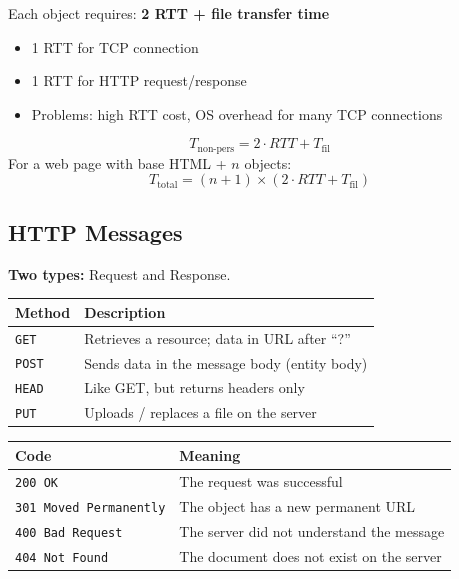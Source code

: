 \begin{warnbox}
Each object requires: \textbf{2 RTT + file transfer time}
\begin{itemize}[noitemsep]
    \item 1 RTT for TCP connection
    \item 1 RTT for HTTP request/response
    \item Problems: high RTT cost, OS overhead for many TCP connections
\end{itemize}
\end{warnbox}

\begin{formulabox}
$$T_{\text{non-pers}} = 2 \cdot RTT + T_{\text{fil}}$$
For a web page with base HTML + $n$ objects:
$$T_{\text{total}} = (n+1) \times (2 \cdot RTT + T_{\text{fil}})$$
\end{formulabox}

\begin{imagebox}
\end{imagebox}

\subsection{HTTP Messages}

\textbf{Two types:} Request and Response.

\begin{keybox}
\begin{tabular}{ll}
\toprule
\textbf{Method} & \textbf{Description} \\
\midrule
\texttt{GET} & Retrieves a resource; data in URL after ``?'' \\
\texttt{POST} & Sends data in the message body (entity body) \\
\texttt{HEAD} & Like GET, but returns headers only \\
\texttt{PUT} & Uploads / replaces a file on the server \\
\bottomrule
\end{tabular}
\end{keybox}

\begin{keybox}
\begin{tabular}{ll}
\toprule
\textbf{Code} & \textbf{Meaning} \\
\midrule
\texttt{200 OK} & The request was successful \\
\texttt{301 Moved Permanently} & The object has a new permanent URL \\
\texttt{400 Bad Request} & The server did not understand the message \\
\texttt{404 Not Found} & The document does not exist on the server \\
\bottomrule
\end{tabular}
\end{keybox}

